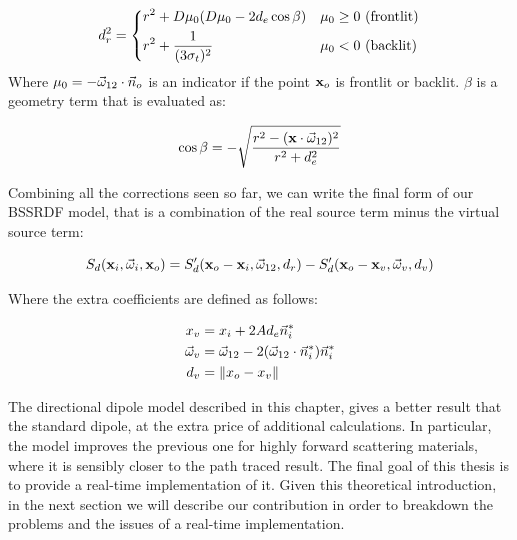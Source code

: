 $$
d_r^2 = \begin{dcases}
r^2 + D \mu_0 (D \mu_0 - 2 d_e \cos \beta) & \mu_0 \geq 0 \  \text{(frontlit)}\\
r^2 + \frac{1}{(3 \sigma_t)^2} & \mu_0 < 0 \ \text{(backlit)}
\end{dcases}
$$
Where $\mu_0 = - \vec{\omega}_{12} \cdot \vec{n}_o$ is an indicator if the point $\mathbf{x}_o$ is frontlit or backlit. $\beta$ is a geometry term that is evaluated as:

$$
\cos \beta = - \sqrt{\frac{r^2 - (\mathbf{x} \cdot \vec{\omega}_{12})^2}{r^2 + d_e^2}}
$$

Combining all the corrections seen so far, we can write the final form of our BSSRDF model, that is a combination of the real source term minus the virtual source term:

$$
S_d(\mathbf{x}_i, \vec{\omega}_i, \mathbf{x}_o) = S'_d(\mathbf{x}_o - \mathbf{x}_i, \vec{\omega}_{12}, d_r) - S'_d(\mathbf{x}_o - \mathbf{x}_v, \vec{\omega}_{v}, d_v)
$$

Where the extra coefficients are defined as follows:

\begin{equation*}
\begin{split}
x_v &= x_i + 2 A d_e \vec{n}_i^* \\
\vec{\omega}_v &= \vec{\omega}_{12} - 2 (\vec{\omega}_{12} \cdot \vec{n}_i^*) \vec{n}_i^* \\
d_v &= \|x_o - x_v\|
\end{split}
\end{equation*}

The directional dipole model described in this chapter, gives a better result that the standard dipole, at the extra price of additional calculations. In particular, the model improves the previous one for highly forward scattering materials, where it is sensibly closer to the path traced result. The final goal of this thesis is to provide a real-time implementation of it. Given this theoretical introduction, in the next section we will describe our contribution in order to breakdown the problems and the issues of a real-time implementation.
